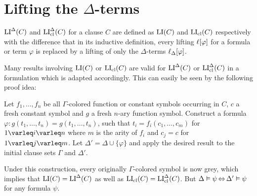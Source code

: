 \documentclass[,%
	draft=false,%
	numbers=noendperiod
	11pt,
	a4paper,
	oneside,%
	openany,
]{memoir}
\begin{document}
\section{Lifting the $\Delta$-terms}

\begin{defi}
	$\operatorname{LI}^\Delta(C)$ and $\operatorname{LI}_{\operatorname{cl}}^\Delta(C)$ for a clause $C$ are defined as $\operatorname{LI}(C)$ and $\operatorname{LI}_{\operatorname{cl}}(C)$ respectively with the difference that in its inductive definition, every lifting $\ell[\varphi]$ for a formula or term $\varphi$ is replaced by a lifting of only the $\Delta$-terms $\ell_{\Delta}[\varphi]$.
\end{defi}

\begin{remark}
	Many results involving $\operatorname{LI}(C)$ or $\operatorname{LI}_{\operatorname{cl}}(C)$ are valid for $\operatorname{LI}^\Delta(C)$ or $\operatorname{LI}_{\operatorname{cl}}^\Delta(C)$
	in a formulation which is adapted accordingly.
	This can easily be seen by the following proof idea:

	Let $f_1, \dots, f_n$ be all $\Gamma$-colored function or constant symbols occurring in $C$,
	$c$ a fresh constant symbol and $g$ a fresh $n$-ary function symbol.
	Construct a formula $\varphi:  g(t_1, \dots, t_n) = g(t_1, \dots, t_n)$,
	such that $t_i = f_i(c_1, \dots, c_m)$ for $1\varleq i \varleq n$ where $m$ is the arity of $f_i$ and $c_j = c$ for $1\varleq j \varleq m$. Let $\Delta' = \Delta \cup \{\varphi\}$ and apply the desired result to the initial clause sets $\Gamma$ and $\Delta'$.

	Under this construction, every originally $\Gamma$-colored symbol is now grey, which implies that $\operatorname{LI}(C) = \operatorname{LI}^\Delta(C)$ as well as $\operatorname{LI}_{\operatorname{cl}}(C) = \operatorname{LI}_{\operatorname{cl}}^\Delta(C)$.
	But $\Delta\vDash \psi \operatorname{\Leftrightarrow} \Delta'\vDash \psi$ for any formula $\psi$.
\end{remark}
\end{document}
